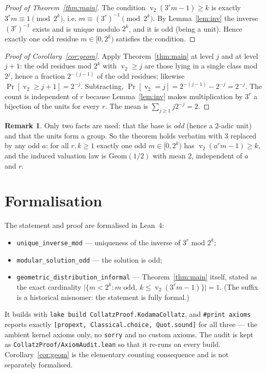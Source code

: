 \documentclass[11pt,a4paper]{article}
\theoremstyle{plain}
\theoremstyle{definition}
\newtheorem{remark}[theorem]{Remark}
\newcommand{\val}{\operatorname{v}_2}
\begin{document}
\begin{proof}[Proof of Theorem~\ref{thm:main}]
The condition $\val(3^{r}m-1)\ge k$ is exactly $3^{r}m\equiv1\pmod{2^{k}}$, i.e.
$m\equiv(3^{r})^{-1}\pmod{2^{k}}$. By Lemma~\ref{lem:inv} the inverse $(3^{r})^{-1}$ exists
and is unique modulo $2^{k}$, and it is odd (being a unit). Hence exactly one odd residue
$m\in[0,2^{k})$ satisfies the condition.
\end{proof}

\begin{proof}[Proof of Corollary~\ref{cor:geom}]
Apply Theorem~\ref{thm:main} at level $j$ and at level $j+1$: the odd residues mod $2^{k}$
with $\val\ge j$ are those lying in a single class mod $2^{j}$, hence a fraction
$2^{-(j-1)}$ of the odd residues; likewise $\Pr[\val\ge j+1]=2^{-j}$. Subtracting,
$\Pr[\val=j]=2^{-(j-1)}-2^{-j}=2^{-j}$. The count is independent of $r$ because
Lemma~\ref{lem:inv} makes multiplication by $3^{r}$ a bijection of the units for every $r$.
The mean is $\sum_{j\ge1}j2^{-j}=2$.
\end{proof}

\begin{remark}
Only two facts are used: that the base is \emph{odd} (hence a $2$-adic unit) and that the
units form a group. So the theorem holds verbatim with $3$ replaced by any odd $a$: for all
$r,k\ge1$ exactly one odd $m\in[0,2^{k})$ has $\val(a^{r}m-1)\ge k$, and the induced
valuation law is $\mathrm{Geom}(1/2)$ with mean $2$, independent of $a$ and $r$.
\end{remark}

\section{Formalisation}
The statement and proof are formalised in Lean~4:
\begin{itemize}[nosep]
  \item \texttt{unique\_inverse\_mod} --- uniqueness of the inverse of $3^{r}$ mod $2^{k}$;
  \item \texttt{modular\_solution\_odd} --- the solution is odd;
  \item \texttt{geometric\_distribution\_informal} --- Theorem~\ref{thm:main} itself, stated
        as the exact cardinality
        $\bigl|\{m<2^{k}:m\text{ odd},\ k\le\val(3^{r}m-1)\}\bigr|=1$. (The suffix is a
        historical misnomer: the statement is fully formal.)
\end{itemize}
It builds with \texttt{lake build CollatzProof.KodamaCollatz}, and \texttt{\#print axioms}
reports exactly \texttt{[propext, Classical.choice, Quot.sound]} for all three --- the
ambient kernel axioms only, no \texttt{sorry} and no custom axioms. The audit is kept as
\texttt{CollatzProof/AxiomAudit.lean} so that it re-runs on every build.
Corollary~\ref{cor:geom} is the elementary counting consequence and is not separately
formalised.
\end{document}
